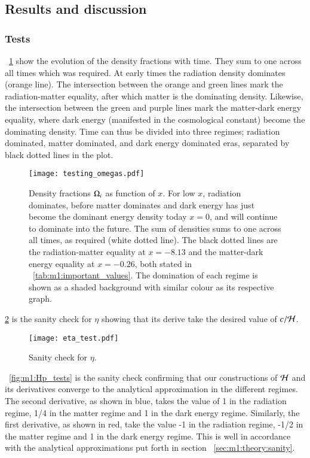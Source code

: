 \subsection{Results and discussion}\label{sec:m1:results}

\subsubsection{Tests}\label{sec:m1:results:tests}
    ~\cref{fig:m1:omega_tests} show the evolution of the density fractions with time. They sum to one across all times which was required. At early times the radiation density dominates (orange line). The intersection between the orange and green lines mark the radiation-matter equality, after which matter is the dominating density. Likewise, the intersection between the green and purple lines mark the matter-dark energy equality, where dark energy (manifested in the cosmological constant) become the dominating density. Time can thus be divided into three regimes; radiation dominated, matter dominated, and dark energy dominated eras, separated by black dotted lines in the plot. 
    \begin{figure}
        \texttt{[image: testing\_omegas.pdf]}
        \caption{Density fractions $\Omega_i$ as function of $x$. For low $x$, radiation dominates, before matter dominates and dark energy has just become the dominant energy density today $x=0$, and will continue to dominate into the future. The sum of densities sums to one across all times, as required (white dotted line). The black dotted lines are the radiation-matter equality at $x=-8.13$ and the matter-dark energy equality at $x=-0.26$, both stated in ~\cref{tab:m1:important_values}. The domination of each regime is shown as a shaded background with similar colour as its respective graph. }
        \label{fig:m1:omega_tests}
    \end{figure}
    \cref{fig:m1:eta_tests} is the sanity check for $\eta$ showing that its derive take the desired value of $c/\mathcal{H}$.

    \begin{figure}
        \texttt{[image: eta\_test.pdf]}
        \caption{Sanity check for $\eta$.}
        \label{fig:m1:eta_tests}
    \end{figure}

    ~\cref{fig:m1:Hp_tests} is the sanity check confirming that our constructions of $\mathcal{H}$ and its derivatives converge to the analytical approximation in the different regimes. The second derivative, as shown in blue, takes the value of 1 in the radiation regime, 1/4 in the matter regime and 1 in the dark energy regime. Similarly, the first derivative, as shown in red, take the value -1 in the radiation regime, -1/2 in the matter regime and 1 in the dark energy regime. This is well in accordance with the analytical approximations put forth in section ~\cref{sec:m1:theory:sanity}. 

